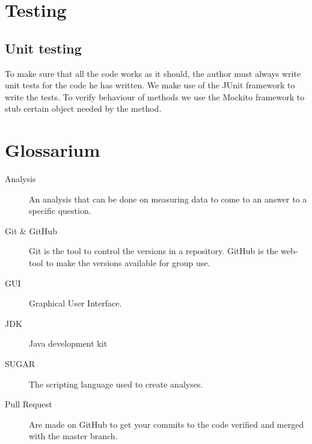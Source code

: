 \documentclass[a4paper]{article}
\begin{document}
\section{Testing}
\subsection{Unit testing}
To make sure that all the code works as it should, the author must always write
unit tests for the code he has written. We make use of the JUnit framework to
write the tests. To verify behaviour of methods we use the Mockito framework to
stub certain object needed by the method.

\section{Glossarium}

\begin{description}

\item[Analysis] An analysis that can be done on measuring data to come to an answer to a specific question.
\item[Git \& GitHub] Git is the tool to control the versions in a repository. GitHub is the web-tool to make the versions available for group use.
\item[GUI] Graphical User Interface.
\item[JDK] Java development kit
\item[SUGAR] The scripting language used to create analyses.
\item[Pull Request] Are made on GitHub to get your commits to the code verified and merged with the master branch.

\end{description}
\end{document}
